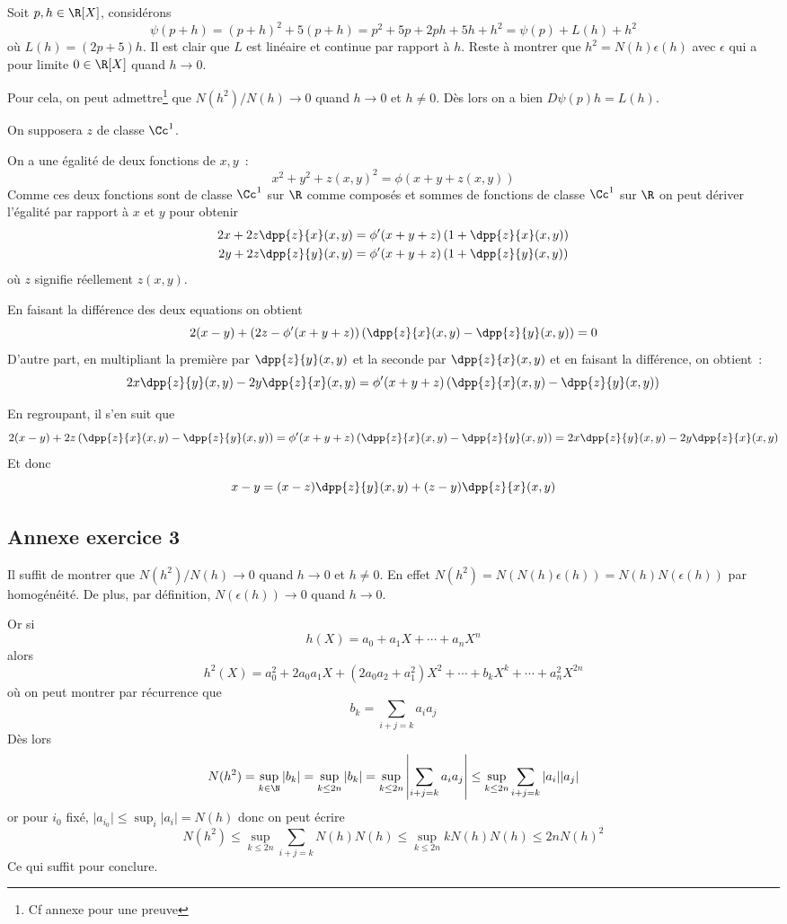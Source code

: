 \documentclass{article}
\begin{document}
Soit $p,h \in \R[X]$, considérons
\[
\psi(p + h) = (p+h)^2 + 5(p+h) = p^2 + 5p + 2ph + 5h + h^2 = \psi(p) + L(h) + h^2
\]
où $L(h) = (2p+5)h$. Il est clair que $L$ est linéaire et continue par rapport à $h$. Reste à montrer que $h^2 = N(h)\epsilon(h)$ avec $\epsilon$ qui a pour limite $0 \in \R[X]$ quand $h \to 0$.

Pour cela, on peut admettre\footnote{Cf annexe pour une preuve} que $N(h^2)/N(h) \to 0$ quand $h \to 0$ et $h \neq 0$. Dès lors on a bien  $D\psi(p)h = L(h)$.

\exercice{}
On supposera $z$ de classe $\Cc^1$.

On a une égalité de deux fonctions de $x,y$~:
\[
x^2+y^2+z(x,y)^2 = \phi(x + y + z(x,y))
\]
Comme ces deux fonctions sont de classe $\Cc^1$ sur $\R$ comme composés et sommes de fonctions de classe $\Cc^1$ sur $\R$ on peut dériver l'égalité par rapport à $x$ et $y$ pour obtenir
\begin{align*}
2x + 2z\dpp{z}{x}(x,y) &= \phi'(x+y+z)\left(1+ \dpp{z}{x}(x,y)\right)\\
2y + 2z\dpp{z}{y}(x,y) &= \phi'(x+y+z)\left(1+ \dpp{z}{y}(x,y)\right)\\
\end{align*}
où $z$ signifie réellement $z(x,y)$.

En faisant la différence des deux equations on obtient
\[	
2(x-y) + \left(2z - \phi'(x+y+z)\right)\left(\dpp{z}{x}(x,y)-\dpp{z}{y}(x,y)\right) = 0
\]
D'autre part, en multipliant la première par $\dpp{z}{y}(x,y)$ et la seconde par $\dpp{z}{x}(x,y)$ et en faisant la différence, on obtient~:
\[
2x \dpp{z}{y}(x,y) - 2y\dpp{z}{x}(x,y) = \phi'(x+y+z)\left(\dpp{z}{x}(x,y)-\dpp{z}{y}(x,y)\right)
\]

En regroupant, il s'en suit que
\[
2(x-y) + 2z\left(\dpp{z}{x}(x,y)-\dpp{z}{y}(x,y)\right) = \phi'(x+y+z)\left(\dpp{z}{x}(x,y)-\dpp{z}{y}(x,y)\right)
=2x \dpp{z}{y}(x,y) - 2y\dpp{z}{x}(x,y)
\]
Et donc
\[
x- y = (x-z)\dpp{z}{y}(x,y) + (z-y)\dpp{z}{x}(x,y)
\]

\appendix
\pagebreak
\subsection*{Annexe exercice 3}
Il suffit de montrer que $N(h^2)/N(h) \to 0$ quand $h \to 0$ et $h \neq 0$. En effet $N(h^2) = N(N(h)\epsilon(h)) = N(h)N(\epsilon(h))$ par homogénéité. De plus, par définition, $N(\epsilon(h)) \to 0$ quand $h \to 0$.

Or si \[
h(X) = a_0 + a_1 X + \cdots + a_n X^n
\]
alors
\[
h^2(X) = a_0^2 + 2a_0a_1 X + (2a_0a_2 + a_1^2)X^2 + \cdots + b_k X^k + \cdots + a_n^2 X^{2n}
\]
où on peut montrer par récurrence que 
\[
b_k = \sum_{i+j = k} a_i a_j
\]
Dès lors
\[
N(h^2) =\sup_{k \in \N} \vert b_k \vert = \sup_{k \leq 2n} \vert b_k \vert = \sup_{k \leq 2n}  \left\vert \sum_{i+j = k} a_i a_j\right\vert  \leq \sup_{k \leq 2n}  \sum_{i+j = k} \vert a_i \vert\vert a_j \vert
\]
or pour $i_0$ fixé, $\vert a_{i_0} \vert \leq \sup_i \vert a_i\vert = N(h)$ donc on peut écrire
\[
N(h^2) \leq \sup_{k \leq 2n}  \sum_{i+j = k} N(h)N(h) \leq \sup_{k \leq 2n}  kN(h)N(h) \leq 2n N(h)^2
\]
Ce qui suffit pour conclure.
\end{document}
